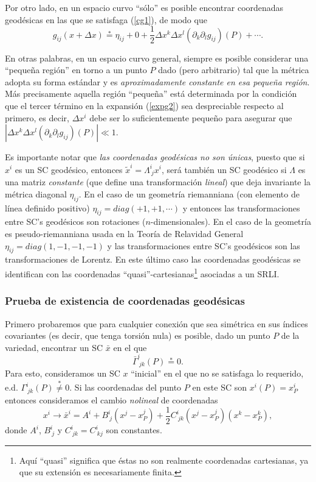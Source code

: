 Por otro lado, en un espacio curvo ``sólo'' es posible encontrar coordenadas geodésicas en las que se satisfaga (\ref{cg1}), de modo que
\begin{equation}
 g_{ij}(x+\Delta x)\stackrel{*}{=} \eta_{ij}+0+\frac{1}{2}\Delta x^k\Delta x^l(\partial_k\partial_lg_{ij})(P)+\cdots . \label{expg2}
\end{equation}

En otras palabras, en un espacio curvo general, siempre es posible considerar una ``pequeña región'' en torno a un punto $P$ dado (pero arbitrario) tal que la métrica adopta su forma estándar y es \textit{aproximadamente constante en esa pequeña región}. Más precisamente aquella región ``pequeña'' está determinada por la condición que el tercer término en la expansión (\ref{expg2}) sea despreciable respecto al primero, es decir, $\Delta x^i$ debe ser lo suficientemente pequeño para asegurar que $\left|\Delta x^k\Delta x^l(\partial_k\partial_lg_{ij})(P)\right|\ll 1$.

Es importante notar que \textit{las coordenadas geodésicas no son únicas}, puesto que si $x^i$ es un SC geodésico, entonces $\tilde{x}^i=\Lambda^i_{\ j}x^i$, será también un SC geodésico si $\Lambda$ es una matriz \textit{constante} (que define una transformación \textit{lineal}) que deja invariante la métrica diagonal $\eta_{ij}$. En el caso de un geometría riemanniana (con elemento de línea definido positivo) $\eta_{ij}=diag(+1,+1,\cdots)$ y entonces las transformaciones entre SC's geodésicos son rotaciones ($n$-dimensionales). En el caso de la geometría es pseudo-riemanniana usada en la Teoría de Relavidad General $\eta_{ij}=diag(1,-1,-1,-1)$ y las transformaciones entre SC's geodésicos son las transformaciones de Lorentz. En este último caso las coordenadas geodésicas se identifican con las coordenadas ``quasi''-cartesianas\footnote{Aquí ``quasi'' significa que éstas no son realmente coordenadas cartesianas, ya que su extensión es necesariamente finita.} asociadas a un SRLI.

\subsubsection{Prueba de existencia de coordenadas geodésicas}

Primero probaremos que para cualquier conexión que sea simétrica en sus índices covariantes (es decir, que tenga torsión nula) es posible, dado un punto $P$ de la variedad, encontrar un SC $\bar{x}$ en el que
\begin{equation}\label{ccgG}
\bar\Gamma^i_{\ jk}(P)\stackrel{*}{=}0.
\end{equation}
Para esto, consideramos un SC $x$ ``inicial'' en el que no se satisfaga lo requerido, e.d. $\Gamma^i_{\ jk}(P)\stackrel{*}{\neq}0$. Si las coordenadas del punto $P$ en este SC son $x^i(P)=x^i_P$ entonces consideramos el cambio \textit{nolineal} de coordenadas
\begin{equation}\label{tccg}
x^i\rightarrow \bar{x}^i=A^i+B^i_{\ j}(x^j-x^j_P)+\frac{1}{2}C^i_{\ jk}(x^j-x^j_P)(x^k-x^k_P),
\end{equation}
donde $A^i$, $B^i_{\ j}$ y $C^i_{\ jk}=C^i_{\ kj}$ son constantes.

